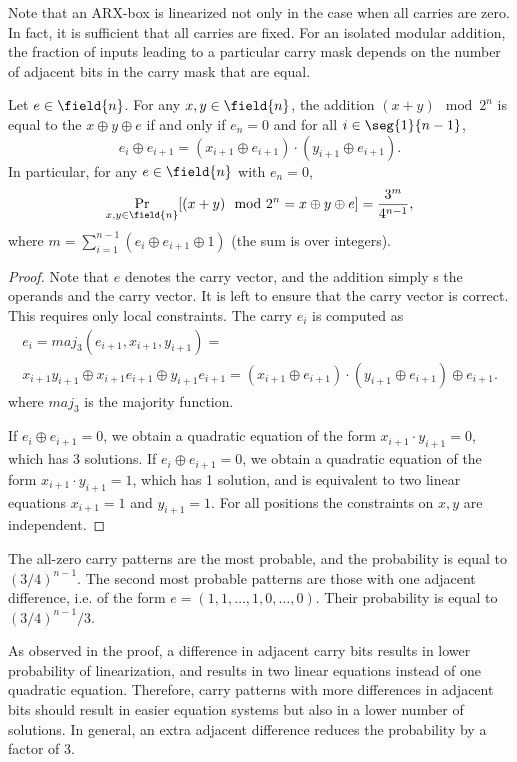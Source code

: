 Note that an ARX-box is linearized not only in the case when all carries are zero. In fact, it is sufficient that all carries are fixed. For an isolated modular addition, the fraction of inputs leading to a particular carry mask depends on the number of adjacent bits in the carry mask that are equal.

\begin{proposition}
Let $e \in \field{n}$.
For any $x, y \in \field{n}$, the addition $(x+y)\mod{2^n}$ is equal to the \txor{} $x\oplus y \oplus e$ if and only if $e_{n} = 0$ and for all $i \in \seg{1}{n-1}$,
$$
e_i \oplus e_{i+1} = (x_{i+1} \oplus e_{i+1}) \cdot (y_{i+1} \oplus e_{i+1}).
$$
In particular, for any $e \in \field{n}$ with $e_n = 0$,
$$
\Pr_{x,y\in\field{n}}[(x+y)\mod{2^n} = x\oplus y \oplus e] = \frac{3^m}{4^{n-1}},
$$
where $m = \sum_{i=1}^{n-1} (e_i \oplus e_{i+1} \oplus 1)$ (the sum is over integers).
\end{proposition}
\begin{proof}
Note that $e$ denotes the carry vector, and the addition simply \txor{}s the operands and the carry vector. It is left to ensure that the carry vector is correct. This requires only local constraints. The carry $e_i$ is computed as
\begin{multline*}
e_i = maj_3(e_{i+1}, x_{i+1}, y_{i+1}) = \\
x_{i+1}y_{i+1} \oplus x_{i+1}e_{i+1}\oplus y_{i+1}e_{i+1} =
(x_{i+1}\oplus e_{i+1})\cdot(y_{i+1}\oplus e_{i+1}) \oplus e_{i+1}.
\end{multline*}
where $maj_3$ is the majority function. 

If $e_i \oplus e_{i+1} = 0$, we obtain a quadratic equation of the form $x_{i+1}\cdot y_{i+1}=0$, which has 3 solutions. If $e_i \oplus e_{i+1} = 0$, we obtain a quadratic equation of the form $x_{i+1}\cdot y_{i+1}=1$, which has 1 solution, and is equivalent to two linear equations $x_{i+1} = 1$ and $y_{i+1} = 1$. For all positions the constraints on $x,y$ are independent.
\end{proof}

\begin{example}
The all-zero carry patterns are the most probable, and the probability is equal to $(3/4)^{n-1}$. The second most probable patterns are those with one adjacent difference, i.e. of the form $e = (1,1,\ldots,1,0,\ldots,0)$. Their probability is equal to $(3/4)^{n-1}/3$.
\end{example}

As observed in the proof, a difference in adjacent carry bits results in lower probability of linearization, and results in two linear equations instead of one quadratic equation. Therefore, carry patterns with more differences in adjacent bits should result in easier equation systems but also in a lower number of solutions. In general, an extra adjacent difference reduces the probability by a factor of 3.

